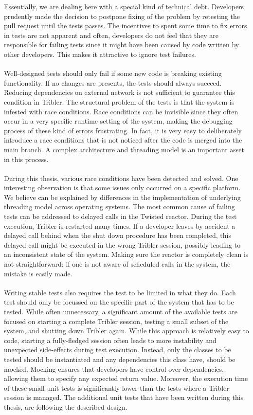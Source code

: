 Essentially, we are dealing here with a special kind of technical debt. Developers prudently made the decision to postpone fixing of the problem by retesting the pull request until the tests passes. The incentives to spent some time to fix errors in tests are not apparent and often, developers do not feel that they are responsible for failing tests since it might have been caused by code written by other developers. This makes it attractive to ignore test failures.\\\\
Well-designed tests should only fail if some new code is breaking existing functionality. If no changes are presents, the tests should always succeed. Reducing dependencies on external network is not sufficient to guarantee this condition in Tribler. The structural problem of the tests is that the system is infested with race conditions. Race conditions can be invisible since they often occur in a very specific runtime setting of the system, making the debugging process of these kind of errors frustrating. In fact, it is very easy to deliberately introduce a race conditions that is not noticed after the code is merged into the main branch. A complex architecture and threading model is an important asset in this process.\\\\
During this thesis, various race conditions have been detected and solved. One interesting observation is that some issues only occurred on a specific platform. We believe can be explained by differences in the implementation of underlying threading model across operating systems. The most common cause of failing tests can be addressed to delayed calls in the Twisted reactor. During the test execution, Tribler is restarted many times. If a developer leaves by accident a delayed call behind when the shut down procedure has been completed, this delayed call might be executed in the wrong Tribler session, possibly leading to an inconsistent state of the system. Making sure the reactor is completely clean is not straightforward: if one is not aware of scheduled calls in the system, the mistake is easily made.\\\\
Writing stable tests also requires the test to be limited in what they do. Each test should only be focussed on the specific part of the system that has to be tested. While often unnecessary, a significant amount of the available tests are focused on starting a complete Tribler session, testing a small subset of the system, and shutting down Tribler again. While this approach is relatively easy to code, starting a fully-fledged session often leads to more instability and unexpected side-effects during test execution. Instead, only the classes to be tested should be instantiated and any dependencies this class have, should be mocked. Mocking ensures that developers have control over dependencies, allowing them to specify any expected return value. Moreover, the execution time of these small unit tests is significantly lower than the tests where a Tribler session is managed. The additional unit tests that have been written during this thesis, are following the described design.

